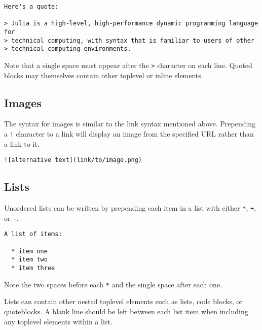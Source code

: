 \begin{lstlisting}
Here's a quote:

> Julia is a high-level, high-performance dynamic programming language for
> technical computing, with syntax that is familiar to users of other
> technical computing environments.
\end{lstlisting}



Note that a single space must appear after the \texttt{>} character on each line. Quoted blocks may themselves contain other toplevel or inline elements.



\hypertarget{9122787766607047979}{}


\subsection{Images}



The syntax for images is similar to the link syntax mentioned above. Prepending a \texttt{!} character to a link will display an image from the specified URL rather than a link to it.




\begin{verbatim}
![alternative text](link/to/image.png)
\end{verbatim}



\hypertarget{5671077042730580546}{}


\subsection{Lists}



Unordered lists can be written by prepending each item in a list with either \texttt{*}, \texttt{+}, or \texttt{-}.




\begin{lstlisting}
A list of items:

  * item one
  * item two
  * item three
\end{lstlisting}



Note the two spaces before each \texttt{*} and the single space after each one.



Lists can contain other nested toplevel elements such as lists, code blocks, or quoteblocks. A blank line should be left between each list item when including any toplevel elements within a list.




